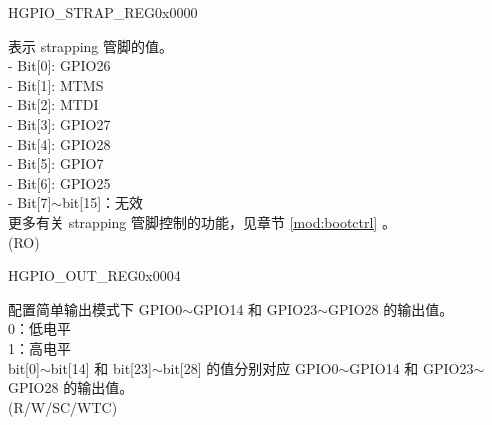 \begin{register}{H}{GPIO\_STRAP\_REG}{0x0000}\label{regdesc:GPIOSTRAPREG}
%
%
\regnewline%
\begin{regdesc}\begin{reglist}
\label{fielddesc:GPIOSTRAPPING}\item [GPIO\_STRAPPING] 表示 strapping 管脚的值。\\
    - Bit[0]: GPIO26\\
    - Bit[1]: MTMS\\
    - Bit[2]: MTDI\\
    - Bit[3]: GPIO27\\
    - Bit[4]: GPIO28\\
    - Bit[5]: GPIO7\\
    - Bit[6]: GPIO25\\
    - Bit[7]$\sim$bit[15]：无效\\
更多有关 strapping 管脚控制的功能，见章节 \ref{mod:bootctrl} \textit{}。\\
 (RO)
\end{reglist}\end{regdesc}
\end{register}


\begin{register}{H}{GPIO\_OUT\_REG}{0x0004}\label{regdesc:GPIOOUTREG}
%
\regnewline%
\begin{regdesc}\begin{reglist}
\label{fielddesc:GPIOOUTDATAORIG}\item [GPIO\_OUT\_DATA\_ORIG] 配置简单输出模式下 GPIO0$\sim$GPIO14 和 GPIO23$\sim$GPIO28 的输出值。\\
0：低电平\\
1：高电平\\ 
bit[0]$\sim$bit[14] 和 bit[23]$\sim$bit[28] 的值分别对应 GPIO0$\sim$GPIO14 和 GPIO23$\sim$GPIO28 的输出值。\\
(R/W/SC/WTC)
\end{reglist}\end{regdesc}
\end{register}


